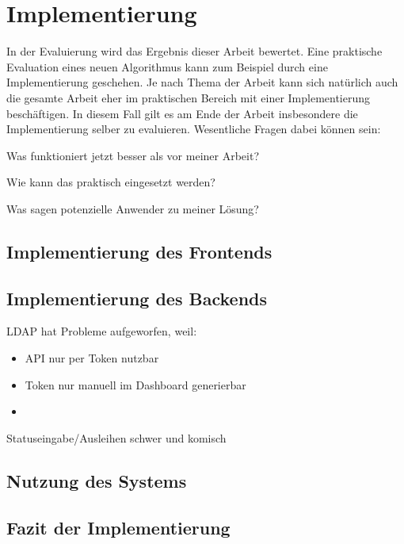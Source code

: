 
\chapter{Implementierung}
\label{chapter-implementierung}

In der Evaluierung wird das Ergebnis dieser Arbeit bewertet. Eine praktische Evaluation eines neuen Algorithmus kann zum Beispiel durch eine Implementierung geschehen. Je nach Thema der Arbeit kann sich natürlich auch die gesamte Arbeit eher im praktischen Bereich mit einer Implementierung beschäftigen. In diesem Fall gilt es am Ende der Arbeit insbesondere die Implementierung selber zu evaluieren. Wesentliche Fragen dabei können sein:
\begin{compactitem}[--]
  \item Was funktioniert jetzt besser als vor meiner Arbeit?
  \item Wie kann das praktisch eingesetzt werden?
  \item Was sagen potenzielle Anwender zu meiner Lösung?
\end{compactitem}

\section{Implementierung des Frontends}

\section{Implementierung des Backends}

LDAP hat Probleme aufgeworfen, weil:

\begin{itemize}
  \item API nur per Token nutzbar
  \item Token nur manuell im Dashboard generierbar
  \item 
\end{itemize}
Statuseingabe/Ausleihen schwer und komisch
\section{Nutzung des Systems}

\section{Fazit der Implementierung}